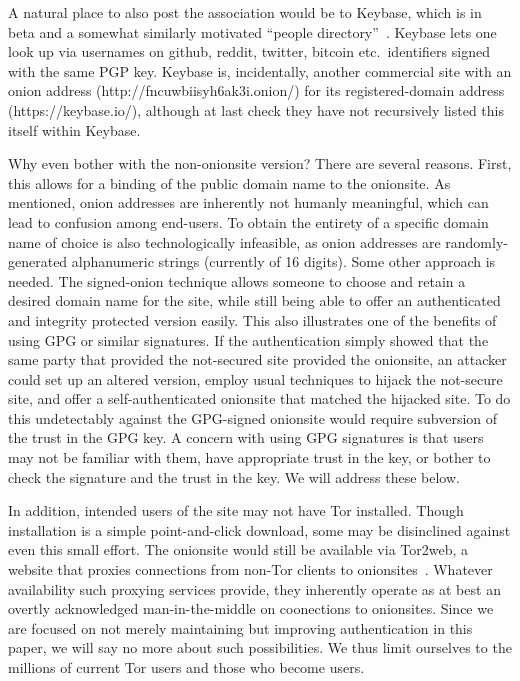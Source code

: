 \documentclass[10pt, conference, compsocconf]{styles/IEEEtran}
\begin{document}
A natural place to also post the association would be to Keybase,
which is in beta and a somewhat similarly motivated ``people
directory''~\cite{keybase}. Keybase lets one look up via usernames on
github, reddit, twitter, bitcoin etc.\ identifiers signed with the
same PGP key. Keybase is, incidentally, another commercial site with
an onion address (http://fncuwbiisyh6ak3i.onion/) for its
registered-domain address (https://keybase.io/), although at last
check they have not recursively listed this itself within Keybase.

Why even bother with the non-onionsite version? There are several
reasons. First, this allows for a binding of the public domain name to
the onionsite. As mentioned, onion addresses are inherently not
humanly meaningful, which can lead to confusion among end-users.  To
obtain the entirety of a specific domain name of choice is also
technologically infeasible, as onion addresses are randomly-generated
alphanumeric strings (currently of 16 digits). Some other approach is
needed. The signed-onion technique allows someone to choose and retain
a desired domain name for the site, while still being able to offer an
authenticated and integrity protected version easily. This also
illustrates one of the benefits of using GPG or similar signatures. If
the authentication simply showed that the same party that provided the
not-secured site provided the onionsite, an attacker could set up an
altered version, employ usual techniques to hijack the not-secure
site, and offer a self-authenticated onionsite that matched the
hijacked site.  To do this undetectably against the GPG-signed
onionsite would require subversion of the trust in the GPG key. A
concern with using GPG signatures is that users may not be familiar
with them, have appropriate trust in the key, or bother to check the
signature and the trust in the key. We will address these below.

In addition, intended users of the site may not have Tor
installed.  Though installation is a simple point-and-click download,
some may be disinclined against even this small effort. The onionsite
would still be available via Tor2web, a website that proxies
connections from non-Tor clients to onionsites~\cite{tor2web}.
Whatever availability such proxying services provide, they inherently
operate as at best an overtly acknowledged man-in-the-middle on
coonections to onionsites.  Since we are focused on not merely
maintaining but improving
authentication in this paper, we will say no more about such
possibilities. We thus limit ourselves to the millions of
current Tor users and those who become users.
\end{document}
